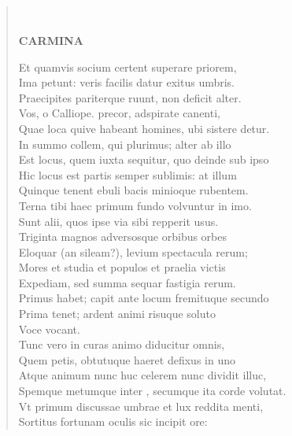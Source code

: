 \documentclass[11pt, a4paper]{report}
\begin{document}
            \subsection*{}
      \begin{verse}
      
        ﻿\pagebreak 
    \begin{center} \textbf{CARMINA} \end{center} \marginpar{[36]} Et quamvis socium certent superare priorem, \\ Ima petunt: veris facilis datur exitus umbris. \\ Praecipites pariterque ruunt, non deficit alter. \\ Vos, o Calliope. precor, adspirate canenti, \\ Quae loca quive habeant homines, ubi sistere detur. \\ In summo collem, qui plurimus; alter ab illo \\ Est locus, quem iuxta sequitur, quo deinde sub ipso \\ Hic locus est partis semper sublimis: at illum \\ Quinque tenent ebuli bacis minioque rubentem. \\ Terna tibi haec primum fundo volvuntur in imo. \\ Sunt alii, quos ipse via sibi repperit usus. \\ Triginta magnos adversosque orbibus orbes \\ Eloquar (an sileam?), levium spectacula rerum; \\ Mores et studia et populos et praelia victis \\ Expediam, sed summa sequar fastigia rerum. \\ Primus habet; capit ante locum fremituque secundo \\ Prima tenet;  \lbrack ardent \rbrack  animi risuque soluto \\ Voce vocant. \\ Tunc vero in curas animo diducitur omnis, \\ Quem petis, obtutuque haeret defixus in uno \\ Atque animum nunc huc celerem nunc dividit illuc, \\ Spemque metumque  \lbrack inter \rbrack , secumque ita corde volutat. \\ Vt primum discussae umbrae et lux reddita menti, \\ Sortitus fortunam oculis sic incipit ore: \\ 

\end{verse}
\end{document}

